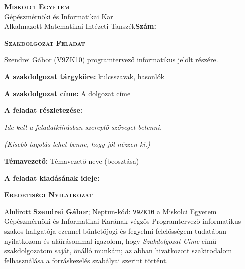 \noindent
\textsc{\textbf{Miskolci Egyetem}}\\
Gépészmérnöki és Informatikai Kar\\
Alkalmazott Matematikai Intézeti Tanszék\hspace*{4cm}\hfil \textbf{Szám:}

\vspace{0.5cm}
\begin{center}
\large\textsc{\textbf{Szakdolgozat Feladat}}
\end{center}
\vspace{0.5cm}

Szendrei Gábor (V9ZK10) programtervező informatikus jelölt részére.

\bigskip
\noindent\textbf{A szakdolgozat tárgyköre:} kulcsszavak, hasonlók

\bigskip
\noindent\textbf{A szakdolgozat címe:} A dolgozat címe

\bigskip
\noindent\textbf{A feladat részletezése:}

\medskip

\emph{Ide kell a feladatkiírásban szereplő szöveget betenni.}

\medskip

\emph{(Kisebb tagolás lehet benne, hogy jól nézzen ki.)}

\vfill

\noindent\textbf{Témavezető:} Témavezető neve (beosztása)


\bigskip
\noindent\textbf{A feladat kiadásának ideje:}


\vspace{1.5cm}

\hfill\makebox[6cm]{\dotfill}

\hfill{}

\clearpage

\vspace*{1cm}  
\begin{center}
\large\textsc{\textbf{Eredetiségi Nyilatkozat}}
\end{center}
\vspace*{2cm}  

Alulírott \textbf{Szendrei Gábor}; Neptun-kód: \texttt{V9ZK10} a Miskolci Egyetem Gépészmérnöki és Informatikai Karának végzős Programtervező informatikus szakos hallgatója ezennel büntetőjogi és fegyelmi felelősségem tudatában nyilatkozom és aláírásommal igazolom, hogy \textit{Szakdolgozat Címe}
című szakdolgozatom saját, önálló munkám; az abban hivatkozott szakirodalom
felhasználása a forráskezelés szabályai szerint történt.

